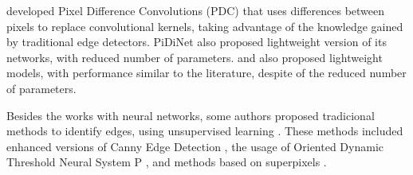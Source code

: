 {



\cite{Su:2021} developed Pixel Difference Convolutions (PDC) that uses differences between pixels to replace convolutional kernels, taking advantage of the knowledge gained by traditional edge detectors.
PiDiNet also proposed lightweight version of its networks, with reduced number of parameters.
\cite{Wibisono:2020} and \cite{Wibisono:2021} also proposed lightweight models, with performance similar to the literature, despite of the reduced number of parameters.

Besides the works with neural networks, some authors proposed tradicional methods to identify edges, using unsupervised learning \cite{Wan:2020} \cite{Wang:2020} \cite{Lin:2021} \cite{Dhillon:2022} \cite{Yan:2022}.
These methods included enhanced versions of Canny Edge Detection \cite{Dhillon:2022}, the usage of Oriented Dynamic Threshold Neural System P \cite{Yan:2022}, and methods based on superpixels \cite{Wan:2020} \cite{Lin:2021}.

\begin{comment}
{\color{blue}
The analysis of related works provides important information regarding some trends in neural networks for edge detection.
One trend is that side-outputs have been widely used in edge detection works in recent years.
In addition, the results indicate that at least the 5 best ODS values in the BSDS500 were achieved by methods that combine intermediary features.


Another important information is related to the number of papers that developed their own loss functions.
For training their network architecture, 11 of 18 works developed its own custom loss.
This is observed due to the characteristics of the problem, where there is an imbalance between edge and background pixels.
According to \cite{ReExtraction:Wen201884}, approximately 83\% of the pixels in the original BSDS500 testing images are non-edge pixels.


\end{comment}}
